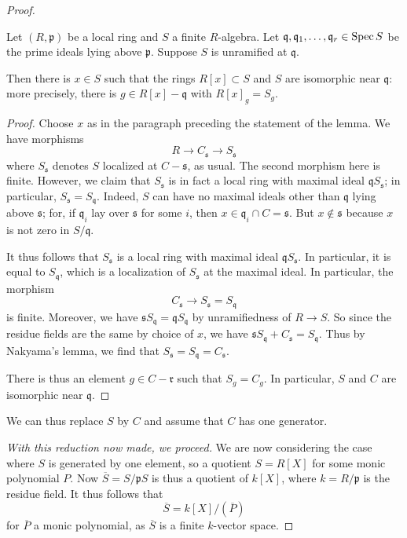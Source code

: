 \begin{proof}
\begin{lemma} 
Let $(R, \mathfrak{p})$ be a local ring and $S$ a finite $R$-algebra. Let
$\mathfrak{q}, \mathfrak{q}_1, \dots, \mathfrak{q}_r \in \operatorname{Spec} S$ be the prime ideals
lying above $\mathfrak{p}$. Suppose $S$ is unramified at $\mathfrak{q}$.

Then there is $x \in S$ such that the rings $R[x] \subset S$ and $S$ are
isomorphic near $\mathfrak{q}$: more precisely, there is $g \in R[x] -
\mathfrak{q}$ with $R[x]_g = S_g$.
\end{lemma} 
\begin{proof} Choose $x$ as in the paragraph preceding the statement of
the lemma.
We have  morphisms
\[ R \to C_{\mathfrak{s}} \to S_{\mathfrak{s}}  \]
where $S_{\mathfrak{s}}$ denotes $S$ localized at $C-\mathfrak{s}$, as usual.
The second morphism here is finite. 
However, we claim that $S_{\mathfrak{s}}$ is in fact a local ring with maximal
ideal $\mathfrak{q} S_{\mathfrak{s}}$; in particular, $S_{\mathfrak{s}} =
S_{\mathfrak{q}}$.
Indeed, $S$ can have no maximal ideals other than
$\mathfrak{q}$ lying above $\mathfrak{s}$; for, 
if $\mathfrak{q}_i$ lay over $\mathfrak{s}$ for some $i$, then $x \in
\mathfrak{q}_i \cap C = \mathfrak{s}$. But $x \notin\mathfrak{s}$ because $x$
is not zero in $S/\mathfrak{q}$.


It thus follows that $S_{\mathfrak{s}}$ is a local ring with maximal ideal
$\mathfrak{q}S_{\mathfrak{s}}$. In particular, it is
equal to $S_{\mathfrak{q}}$, which is a localization of
$S_{\mathfrak{s}}$ at the maximal ideal.
In particular, the morphism 
\[ C_{\mathfrak{s}} \to S_{\mathfrak{s}} = S_{\mathfrak{q}}  \]
is finite. Moreover, we have $\mathfrak{s} S_{\mathfrak{q}} =
\mathfrak{q}S_{\mathfrak{q}}$ by unramifiedness of $R \to S$.
So since the residue fields are the same by choice of $x$, we have
$\mathfrak{s}S_{\mathfrak{q}} + C_{\mathfrak{s}} = S_{\mathfrak{q}}$.
Thus by Nakyama's lemma, we find that $S_{\mathfrak{s}} = S_{\mathfrak{q}} = C_{\mathfrak{s}}$.


There is thus an element $g \in C - \mathfrak{r}$ such that $S_g = C_g$.
In particular, $S$ and $C$ are isomorphic near $\mathfrak{q}$.
\end{proof} 

We can thus replace $S$ by $C$ and assume that $C$ has one generator. 

\emph{With this reduction now made, we proceed.} We are now considering the
case where $S$ is generated by one element, so a quotient $S = R[X]$ for
some monic polynomial $P$. 
Now $\overline{S} = S/\mathfrak{p}S$ is thus a quotient of $k[X]$, where $k =
R/\mathfrak{p}$ is the residue field.
It thus follows that
\[ \overline{S} = k[X]/(\overline{P})  \]
for $\overline{P}$ a monic polynomial, as $\overline{S}$ is a finite
$k$-vector space. 


\end{proof}
